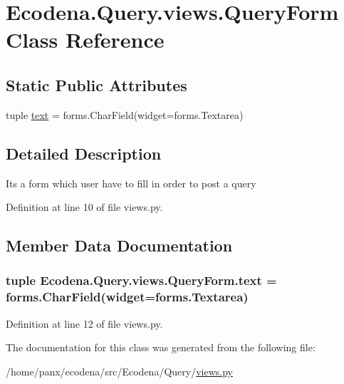 \hypertarget{class_ecodena_1_1_query_1_1views_1_1_query_form}{
\section{Ecodena.Query.views.QueryForm Class Reference}
\label{dd/dee/class_ecodena_1_1_query_1_1views_1_1_query_form}
}
\subsection*{Static Public Attributes}
\begin{DoxyCompactItemize}
\item 
tuple \hyperlink{class_ecodena_1_1_query_1_1views_1_1_query_form_a2c0801fd8cba4ce11004ea7c14823bfa}{text} = forms.CharField(widget=forms.Textarea)
\end{DoxyCompactItemize}


\subsection{Detailed Description}
\begin{DoxyVerb}Its a form which user have to fill in order to post a query\end{DoxyVerb}
 

Definition at line 10 of file views.py.



\subsection{Member Data Documentation}
\hypertarget{class_ecodena_1_1_query_1_1views_1_1_query_form_a2c0801fd8cba4ce11004ea7c14823bfa}{
\subsubsection[{text}]{\setlength{\rightskip}{0pt plus 5cm}tuple {\bf Ecodena.Query.views.QueryForm.text} = forms.CharField(widget=forms.Textarea)}}
\label{dd/dee/class_ecodena_1_1_query_1_1views_1_1_query_form_a2c0801fd8cba4ce11004ea7c14823bfa}


Definition at line 12 of file views.py.



The documentation for this class was generated from the following file:\begin{DoxyCompactItemize}
\item 
/home/panx/ecodena/src/Ecodena/Query/\hyperlink{_query_2views_8py}{views.py}\end{DoxyCompactItemize}
